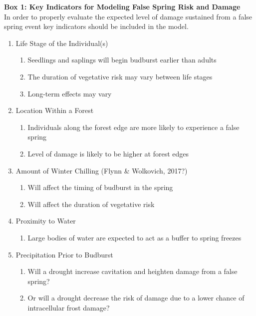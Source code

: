 \documentclass{article}\usepackage[]{graphicx}\usepackage[]{color}
\begin{document}
\captionsetup[table]{textformat=empty,labelformat=empty}
\begin{siderules}
\textbf {Box 1: Key Indicators for Modeling False Spring Risk and Damage}\\
In order to properly evaluate the expected level of damage sustained from a false spring event
key indicators should be included in the model.
\renewcommand{\theenumi}{\Roman{enumi}}
\renewcommand{\theenumii}{\roman{enumii}}
\begin{enumerate}
  \item Life Stage of the Individual(s) \citep{Caffarra2011}
  \begin{enumerate}
    \item Seedlings and saplings will begin budburst earlier than adults
    \item The duration of vegetative risk may vary between life stages
    \item Long-term effects may vary
  \end{enumerate}
  \item Location Within a Forest \citep{Augspurger2013}
  \begin{enumerate}
    \item Individuals along the forest edge are more likely to experience a false spring
    \item Level of damage is likely to be higher at forest edges
  \end{enumerate}
  \item Amount of Winter Chilling (Flynn \& Wolkovich, 2017?)
  \begin{enumerate}
    \item Will affect the timing of budburst in the spring
    \item Will affect the duration of vegetative risk
  \end{enumerate}
  \item Proximity to Water %
  \begin{enumerate}
    \item Large bodies of water are expected to act as a buffer to spring freezes
  \end{enumerate}
  \item Precipitation Prior to Budburst \citep{Anderegg2013}
  \begin{enumerate}
    \item Will a drought increase cavitation and heighten damage from a false spring?
    \item Or will a drought decrease the risk of damage due to a lower chance of intracellular frost damage?

\end{enumerate}
\end{enumerate}
\end{siderules}
\end{document}
